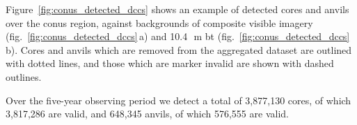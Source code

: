 Figure~\ref{fig:conus_detected_dccs} shows an example of detected cores and anvils over the \acrshort{conus} region, against backgrounds of composite visible imagery (fig.~\ref{fig:conus_detected_dccs}\,a) and 10.4\,\unit{\mu m} \acrshort{bt} (fig.~\ref{fig:conus_detected_dccs}\,b).
Cores and anvils which are removed from the aggregated dataset are outlined with dotted lines, and those which are marker invalid are shown with dashed outlines.

Over the five-year observing period we detect a total of 3,877,130 cores, of which 3,817,286 are valid, and 648,345 anvils, of which 576,555 are valid.





